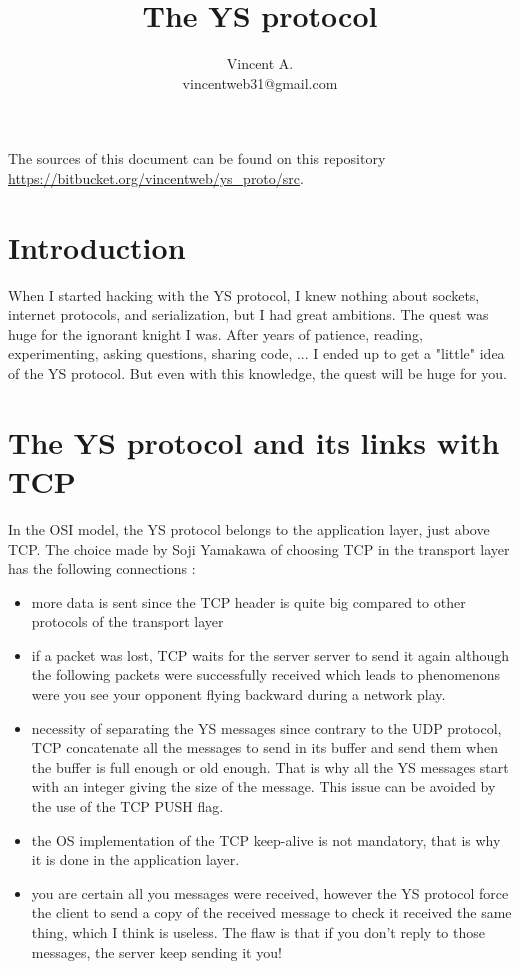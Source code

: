 \documentclass{article}
\title{The YS protocol}
\author{Vincent \textsc{A.}\\ vincentweb31@gmail.com}
\begin{document}
\maketitle

\vfill

The sources of this document can be found on this repository\\ \url{https://bitbucket.org/vincentweb/ys_proto/src}.

\thispagestyle{empty}

\newpage


\clearpage

\tableofcontents

\clearpage



\section{Introduction}

When I started hacking with the YS protocol, I knew nothing about sockets, internet protocols, and serialization, but I had great ambitions. The quest was huge for the ignorant knight I was. After years of patience, reading, experimenting, asking questions, sharing code, ... I ended up to get a "little" idea of the YS protocol. But even with this knowledge, the quest will be huge for you.


\section{The YS protocol and its links with TCP}

In the OSI model, the YS protocol belongs to the application layer, just above TCP. The choice made by Soji Yamakawa of choosing TCP in the transport layer has the following connections :
\begin{itemize}
    \item more data is sent since the TCP header is quite big compared to other protocols of the transport layer
    \item if a packet was lost, TCP waits for the server server to send it again although the following packets were successfully received which leads to phenomenons were you see your opponent flying backward during a network play.
    \item necessity of separating the YS messages since contrary to the UDP protocol, TCP concatenate all the messages to send in its buffer and send them when the buffer is full enough or old enough. That is why all the YS messages start with an integer giving the size of the message. This issue can be avoided by the use of the TCP PUSH flag.
    \item the OS implementation of the TCP keep-alive is not mandatory, that is why it is done in the application layer.
    \item you are certain all you messages were received, however the YS protocol force the client to send a copy of the received message to check it received the same thing, which I think is useless. The flaw is that if you don't reply to those messages, the server keep sending it you!
\end{itemize}
\end{document}
